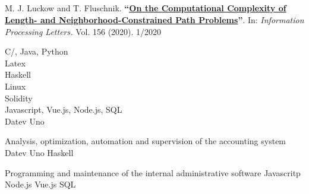 \documentclass[11pt]{thyv}
\begin{document}
	\begin{mdframed}

		\begin{minipage}[t]{0.50\textwidth} %
			\vspace{-\baselineskip} %

			\\
			\\
				
		\end{minipage}
		\begin{minipage}[t]{0.50\textwidth} 
			\vspace{-\baselineskip} %
			
			\\
			\\
		\end{minipage}


			M. J. Luckow and T. Fluschnik. \textbf{``\href{https://doi.org/10.1016/j.ipl.2019.105913}{On the Computational Complexity of Length- and Neighborhood-Constrained Path Problems}''}. In: \textit{Information Processing Letters.} Vol. 156 (2020). \hfill \textcolor{thyGrey}{1/2020} %
		
			C/\Cplusplus, Java, Python \hfill \ThreeOfFour \\
			Latex \hfill \ThreeOfFour \\
			Haskell \hfill \OneOfFour \\
			Linux \hfill \TwoOfFour \\
			Solidity \hfill \TwoOfFour \\
			Javascript, Vue.js, Node.js, SQL \hfill \TwoOfFour \\
			Datev Uno \hfill \FourOfFour

			{Analysis, optimization, automation and supervision of the accounting system}
			{Datev Uno \slashsep Haskell}

			{Programming and maintenance of the internal administrative software}
			{Javascritp \slashsep Node.js \slashsep Vue.js \slashsep SQL}


\end{mdframed}
\end{document}
